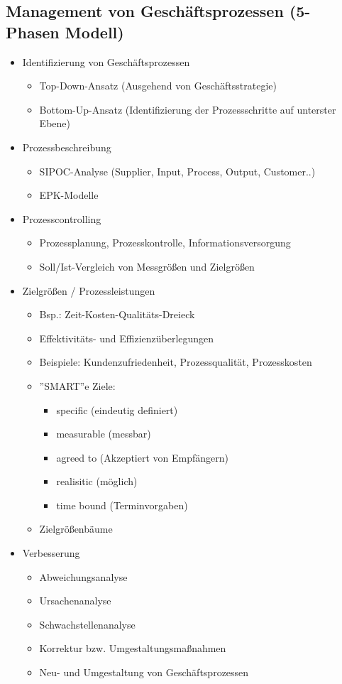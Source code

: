 \subsection{Management von Geschäftsprozessen (5-Phasen Modell)}
\begin{itemize}
\item Identifizierung von Geschäftsprozessen
	\begin{itemize}
	\item Top-Down-Ansatz (Ausgehend von Geschäftsstrategie)
	\item Bottom-Up-Ansatz (Identifizierung der Prozessschritte auf unterster Ebene)
	\end{itemize}
	
\item Prozessbeschreibung
	\begin{itemize}
	\item SIPOC-Analyse (Supplier, Input, Process, Output, Customer..)
	\item EPK-Modelle
	\end{itemize}

\item Prozesscontrolling
	\begin{itemize}
	\item Prozessplanung, Prozesskontrolle, Informationsversorgung
	\item Soll/Ist-Vergleich von Messgrößen und Zielgrößen
	\end{itemize} 
	
\item Zielgrößen / Prozessleistungen
		\begin{itemize}
		\item Bsp.: Zeit-Kosten-Qualitäts-Dreieck
		\item Effektivitäts- und Effizienzüberlegungen
		\item Beispiele: Kundenzufriedenheit, Prozessqualität, Prozesskosten
		\item ''SMART''e Ziele:
			\begin{itemize}
			\item specific (eindeutig definiert)
			\item measurable (messbar)
			\item agreed to (Akzeptiert von Empfängern)
			\item realisitic (möglich)
			\item time bound (Terminvorgaben)
			\end{itemize}
		\item Zielgrößenbäume
		\end{itemize}

\item Verbesserung
	\begin{itemize}
	\item Abweichungsanalyse
	\item Ursachenanalyse
	\item Schwachstellenanalyse
	\item Korrektur bzw. Umgestaltungsmaßnahmen
	\item Neu- und Umgestaltung von Geschäftsprozessen
	\end{itemize}		

\end{itemize}


